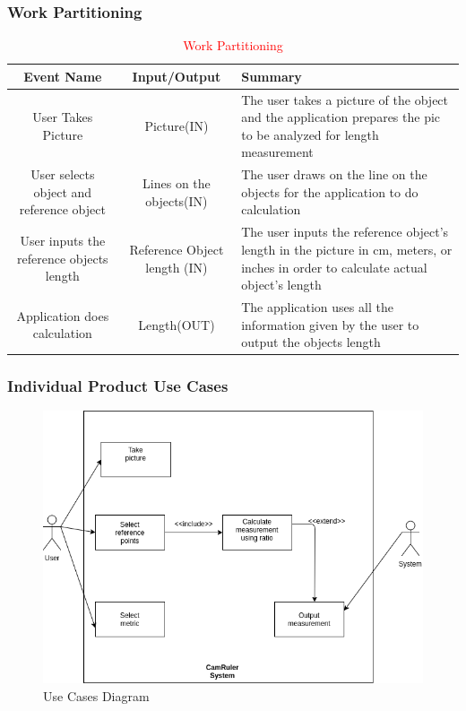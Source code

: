 \documentclass[12pt, titlepage]{article}
\begin{document}
\subsubsection{Work Partitioning}
	\begin{table}[H]

	\begin{tabular}{|c|c|L|}
		\hline
		\hline
		Event Name & Input/Output & Summary\\
		\hline
		User Takes Picture & Picture(IN) & The user takes a picture of the object and the application prepares the pic to be analyzed for length measurement\\
		\hline
		User selects object and reference object& Lines on the objects(IN) & The user draws on the line on the objects for the application to do calculation \\ 
		\hline 
		User inputs the reference objects length & 
		Reference Object length (IN) & The user inputs the reference object's length in the picture in cm, meters, or inches in order to calculate actual object's length \\
		\hline
		Application does calculation & Length(OUT) & The application uses all the information given by the user to output the objects length \\ 
		\hline
		\hline
	\end{tabular}
		\caption{\textcolor{red}{Work Partitioning}}
		\label{table:2}
\end{table}

\subsubsection{Individual Product Use Cases}
\begin{figure}[H]
   \centering
   \includegraphics[width=6in]{use_cases.png} 
   \caption{Use Cases Diagram}
   \label{fig:2}
\end{figure}
\end{document}
